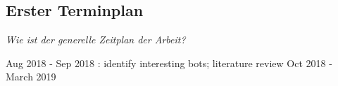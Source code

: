 \documentclass[pdftex,a4paper,11pt]{scrartcl}
\begin{document}
\subsection{Erster Terminplan}
\noindent  \emph{Wie ist der generelle Zeitplan der Arbeit? }

Aug 2018 - Sep 2018 : identify interesting bots; literature review
Oct 2018 - March 2019

\begin{comment}
\begin{itemize}
	\item Sie sollten bereits wissen, wann Sie fertig sein wollen und von dort mit der Rückwärtsterminierung starten.
	\item Ihre Arbeit ist ein Projekt, daher planen Sie es auch wie eines. Nutzen Sie zur Visualisierung ein Gantt-Chart.
\end{itemize}
\end{comment}

{}   %


\begin{comment}
\newpage
\section*{Anhang I: Auszug Prüfungsordnung Master}
\label{sec:master}

\begin{figure}[!h]
	\centering
		\texttt{[image: pics/Auszug\_Master\_Pruefungsordnung.pdf]}
	\caption{Auszug Prüfungsordnung Master}
\end{figure}
\end{comment}
\end{document}
